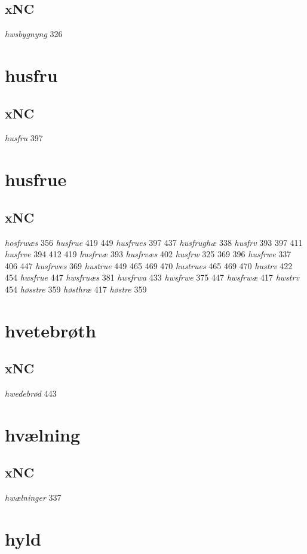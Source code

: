 \documentclass[a4paper,twocolumn]{article}
\begin{document}
\subsection{xNC}
\label{sec:org043195c}
\emph{hwsbygnyng} 326 
\section{husfru}
\label{sec:org959c21b}
\subsection{xNC}
\label{sec:org99f9139}
\emph{husfru} 397 
\section{husfrue}
\label{sec:orgb197791}
\subsection{xNC}
\label{sec:orgefd403d}
\emph{hosfrwæs} 356 \emph{husfrue} 419 449 \emph{husfrues} 397 437 \emph{husfrughæ} 338 \emph{husfrv} 393 397 411 \emph{husfrve} 394 412 419 \emph{husfrvæ} 393 \emph{husfrvæs} 402 \emph{husfrw} 325 369 396 \emph{husfrwe} 337 406 447 \emph{husfrwes} 369 \emph{hustrue} 449 465 469 470 \emph{hustrues} 465 469 470 \emph{hustrv} 422 454 \emph{hwsfrue} 447 \emph{hwsfruæs} 381 \emph{hwsfrwa} 433 \emph{hwsfrwe} 375 447 \emph{hwsfrwæ} 417 \emph{hwstrv} 454 \emph{høsstre} 359 \emph{høsthræ} 417 \emph{høstre} 359 
\section{hvetebrøth}
\label{sec:org662f572}
\subsection{xNC}
\label{sec:orgb916780}
\emph{hwedebrød} 443 
\section{hvælning}
\label{sec:orgd611349}
\subsection{xNC}
\label{sec:org5a2d8c0}
\emph{hwælninger} 337 
\section{hyld}
\label{sec:org23128a0}
\end{document}

